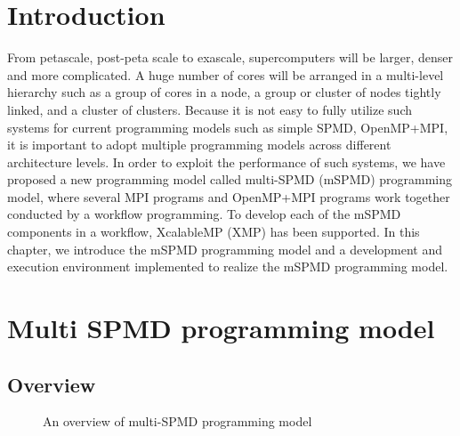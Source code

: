 \documentclass[graybox]{svmult}
\begin{document}
\section{Introduction}

From petascale, post-peta scale to exascale, supercomputers will be larger, denser and more complicated. A huge number of cores will be arranged in a multi-level hierarchy such as a group of cores in a node, a group or cluster of nodes tightly linked, and a cluster of clusters. Because it is not easy to fully utilize such systems for current programming models such as simple SPMD, OpenMP+MPI, it is important to adopt multiple programming models across different architecture levels. In order to exploit the performance of such systems, we have proposed a new programming model called multi-SPMD (mSPMD) programming model, where several MPI programs and OpenMP+MPI programs work together conducted by a workflow programming\cite{tsuji2013c}. To develop each of the mSPMD components in a workflow, XcalableMP (XMP) has been supported. In this chapter, we introduce the mSPMD programming model and a development and execution environment implemented to realize the mSPMD programming model.

\section{Multi SPMD programming model}
\label{section:multi spmd programming model}

\subsection{Overview}

\begin{figure}[t]
 \begin{center}
\caption{An overview of multi-SPMD programming model}
\label{figure:overview of mSPMD}
 \end{center}
\end{figure}
\end{document}

